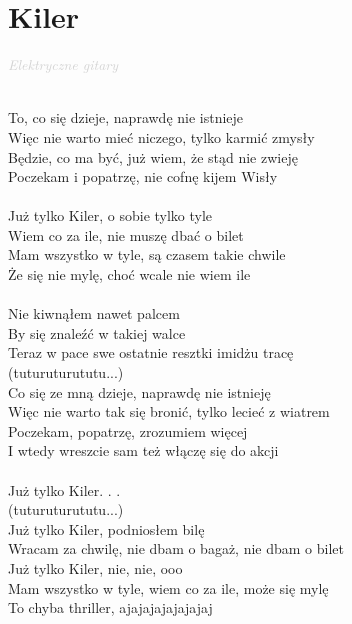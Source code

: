 \documentclass[a5paper, 10pt]{book}
\begin{document}
\section{Kiler}\textcolor{lightgray}{\textit{Elektryczne gitary}}\\~\\
\begin{minipage}[t]{0.7\textwidth}
  To, co się dzieje, naprawdę nie istnieje\\
  Więc nie warto mieć niczego, tylko karmić zmysły\\
  Będzie, co ma być, już wiem, że stąd nie zwieję\\
  Poczekam i popatrzę, nie cofnę kijem Wisły\\
  \\
  \hspace*{6mm}Już tylko Kiler, o sobie tylko tyle\\
  \hspace*{6mm}Wiem co za ile, nie muszę dbać o bilet\\
  \hspace*{6mm}Mam wszystko w tyle, są czasem takie chwile\\
  \hspace*{6mm}Że się nie mylę, choć wcale nie wiem ile\\
  \\
  Nie kiwnąłem nawet palcem\\
  By się znaleźć w takiej walce\\
  Teraz w pace swe ostatnie resztki imidżu tracę\\
  \hspace*{3mm}(tuturuturututu...)\\
  Co się ze mną dzieje, naprawdę nie istnieję\\
  Więc nie warto tak się bronić, tylko lecieć z wiatrem\\
  Poczekam, popatrzę, zrozumiem więcej\\
  I wtedy wreszcie sam też włączę się do akcji\\
  \\
  \hspace*{6mm}Już tylko Kiler. . .\\
  \hspace*{3mm}(tuturuturututu...)\\
  Już tylko Kiler, podniosłem bilę\\
  Wracam za chwilę, nie dbam o bagaż, nie dbam o bilet\\
  Już tylko Kiler, nie, nie, ooo\\
  Mam wszystko w tyle, wiem co za ile, może się mylę\\
  To chyba thriller, ajajajajajajajaj\\

\end{minipage}
\end{document}
